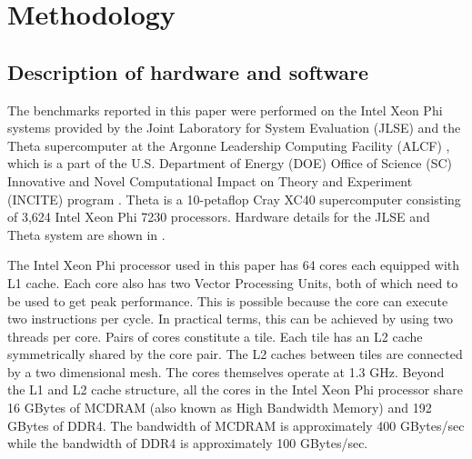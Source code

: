 \section{Methodology}
\label{sec:benchmark}

\subsection{Description of hardware and software}
\label{ssec:supercomp}
The benchmarks reported in this paper were performed on the Intel Xeon Phi systems provided by the Joint Laboratory for System Evaluation (JLSE) and the Theta supercomputer at the Argonne Leadership Computing Facility (ALCF) \cite{alcf}, which is a part of the U.S. Department of Energy (DOE) Office of Science (SC) Innovative and Novel Computational Impact on Theory and Experiment (INCITE) program \cite{incite}. Theta is a 10-petaflop Cray XC40 supercomputer consisting of 3,624 Intel Xeon Phi 7230 processors. Hardware details for the JLSE and Theta system are shown in .

The Intel Xeon Phi processor used in this paper has 64 cores each equipped with L1 cache. Each core also has two Vector Processing Units, both of which need to be used to get peak performance. This is possible because the core can execute two instructions per cycle. In practical terms, this can be achieved by using two threads per core. Pairs of cores constitute a tile. Each tile has an L2 cache symmetrically shared by the core pair. The L2 caches between tiles are connected by a two dimensional mesh. The cores themselves operate at 1.3 GHz. Beyond the L1 and L2 cache structure, all the cores in the Intel Xeon Phi processor share 16 GBytes of MCDRAM (also known as High Bandwidth Memory) and 192 GBytes of DDR4. The bandwidth of MCDRAM is approximately 400 GBytes/sec while the bandwidth of DDR4 is approximately 100 GBytes/sec. 

